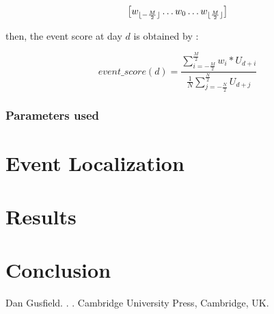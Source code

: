 \documentclass[11pt]{article}
\DeclarePairedDelimiter\floor{\lfloor}{\rfloor}
\begin{document}
$$ \big[ w_{ \floor{ -\frac{M}{2} } }  \dots w_{0}  \dots  w_{ \floor{ \frac{M}{2} } } \big] $$

then, the event score at day $d$ is obtained by :

$$ 
event\_score(d) =  \frac {\sum_{i=-\frac{M}{2}}^{\frac{M}{2}} w_i * U_{d + i} }
				    {\frac{1}{N} \sum_{j=-\frac{N}{2}}^{\frac{N}{2}}  U_{d + j} }
$$

\subsubsection{Parameters used}


\section{Event Localization}

\section{Results}

\section{Conclusion}

\begin{thebibliography}{}

Dan Gusfield.
.
.
\newblock Cambridge University Press, Cambridge, UK.

\end{thebibliography}
\end{document}
